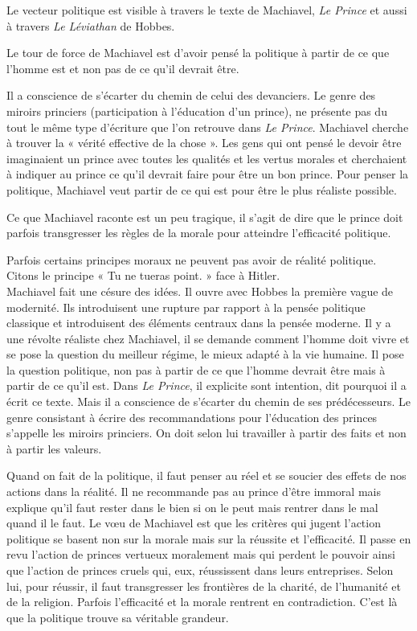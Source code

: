 \documentclass[a4paper,11pt]{article}
\begin{document}
	Le vecteur politique est visible à travers le texte de Machiavel, \textit{Le Prince} et aussi à travers \textit{Le Léviathan} de Hobbes.
	
	Le tour de force de Machiavel est d’avoir pensé la politique à partir de ce que l’homme est et non pas de ce qu’il devrait être.
	
	Il a conscience de s’écarter du chemin de celui des devanciers. Le genre des miroirs princiers (participation à l’éducation d’un prince), ne présente pas du tout le même type d’écriture que l’on retrouve dans \textit{Le Prince}.
	Machiavel cherche à trouver la « vérité effective de la chose ».
	Les gens qui ont pensé le devoir être imaginaient un prince avec toutes les qualités et les vertus morales et cherchaient à indiquer au prince ce qu’il devrait faire pour être un bon prince.
	Pour penser la politique, Machiavel veut partir de ce qui est pour être le plus réaliste possible.
	
	Ce que Machiavel raconte est un peu tragique, il s’agit de dire que le prince doit parfois transgresser les règles de la morale pour atteindre l’efficacité politique.
	
	Parfois certains principes moraux ne peuvent pas avoir de réalité politique.
	Citons le principe « Tu ne tueras point. » face à Hitler.\\
	
	
	Machiavel fait une césure des idées.
	Il ouvre avec Hobbes la première vague de modernité.
	Ils introduisent une rupture par rapport à la pensée politique classique et introduisent des éléments centraux dans la pensée moderne.
	Il y a une révolte réaliste chez Machiavel, il se demande comment l’homme doit vivre et se pose la question du meilleur régime, le mieux adapté à la vie humaine. Il pose la question politique, non pas à partir de ce que l’homme devrait être mais à partir de ce qu’il est.
	Dans \textit{Le Prince}, il explicite sont intention, dit pourquoi il a écrit ce texte.
	Mais il a conscience de s’écarter du chemin de ses prédécesseurs.
	Le genre consistant à écrire des recommandations pour l’éducation des princes s’appelle les miroirs princiers. On doit selon lui travailler à partir des faits et non à partir les valeurs.

	Quand on fait de la politique, il faut penser au réel et se soucier des effets de nos actions dans la réalité.
	Il ne recommande pas au prince d’être immoral mais explique qu’il faut rester dans le bien si on le peut mais rentrer dans le mal quand il le faut.
	Le vœu de Machiavel est que les critères qui jugent l’action politique se basent non sur la morale mais sur la réussite et l’efficacité.
	Il passe en revu l’action de princes vertueux moralement mais qui perdent le pouvoir ainsi que l’action de princes cruels qui, eux, réussissent dans leurs entreprises.
	Selon lui, pour réussir, il faut transgresser les frontières de la charité, de l’humanité et de la religion. Parfois l’efficacité et la morale rentrent en contradiction.
	C’est là que la politique trouve sa véritable grandeur.\\
\end{document}
